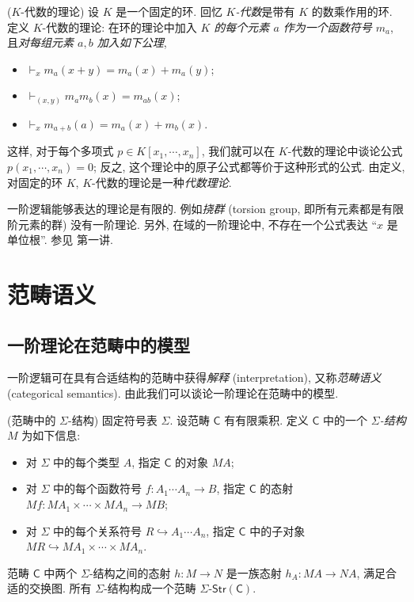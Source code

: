 \begin{example}
	{($K$-代数的理论)}
	设 $K$ 是一个固定的环. 回忆 \emph{$K$-代数}是带有 $K$ 的数乘作用的环. 定义 $K$-代数的理论: 在环的理论中加入 \emph{$K$ 的每个元素 $a$ 作为一个函数符号 $m_a$}, 且\emph{对每组元素 $a,b$ 加入如下公理},
	\begin{itemize}
		\item $\vdash_x m_a(x+y) = m_a(x) + m_a(y)$;
		\item $\vdash_{(x,y)} m_am_b (x) = m_{ab}(x)$;
		\item $\vdash_x m_{a+b}(a) = m_a(x) + m_b(x)$.
	\end{itemize}
	这样, 对于每个多项式 $p\in K[x_1,\cdots,x_n]$, 我们就可以在 $K$-代数的理论中谈论公式 $p(x_1,\cdots,x_n) = 0$; 反之, 这个理论中的原子公式都等价于这种形式的公式.
	由定义, 对固定的环 $K$, $K$-代数的理论是一种\emph{代数理论}.
\end{example}

\begin{remark}
	{}
	一阶逻辑能够表达的理论是有限的. 例如\emph{挠群} (torsion group, 即所有元素都是有限阶元素的群) 没有一阶理论.
	另外, 在域的一阶理论中, 不存在一个公式表达 ``$x$ 是单位根''. 参见 \cite{Lurie-Categorical-Logic} 第一讲.
\end{remark}

\section{范畴语义}

\subsection{一阶理论在范畴中的模型}

一阶逻辑可在具有合适结构的范畴中获得\emph{解释} (interpretation), 又称\emph{范畴语义} (categorical semantics).
由此我们可以谈论一阶理论在范畴中的模型.

\begin{definition}
	[label={sigma-structures-in-category}]
	{(范畴中的 $\Sigma$-结构)}
	固定符号表 $\Sigma$. 设范畴 $\mathsf C$ 有有限乘积.
	定义 $\mathsf C$ 中的一个 \emph{$\Sigma$-结构} $M$ 为如下信息:
	\begin{itemize}
		\item 对 $\Sigma$ 中的每个类型 $A$, 指定 $\mathsf C$ 的对象 $MA$;
		\item 对 $\Sigma$ 中的每个函数符号 $f\colon A_1\cdots A_n \to B$, 指定 $\mathsf C$ 的态射
		$Mf \colon MA_1\times\cdots\times MA_n \to MB$;
		\item 对 $\Sigma$ 中的每个关系符号 $R \hookrightarrow A_1\cdots A_n$, 指定 $\mathsf C$ 中的子对象
		$MR \hookrightarrow MA_1\times\cdots\times MA_n$.
	\end{itemize}
	
	范畴 $\mathsf C$ 中两个 $\Sigma$-结构之间的态射 $h\colon M\to N$ 是一族态射 $h_A \colon MA \to NA$, 满足合适的交换图. 所有 $\Sigma$-结构构成一个范畴 $\Sigma\text{-}\mathsf{Str}(\mathsf C)$.
\end{definition}

